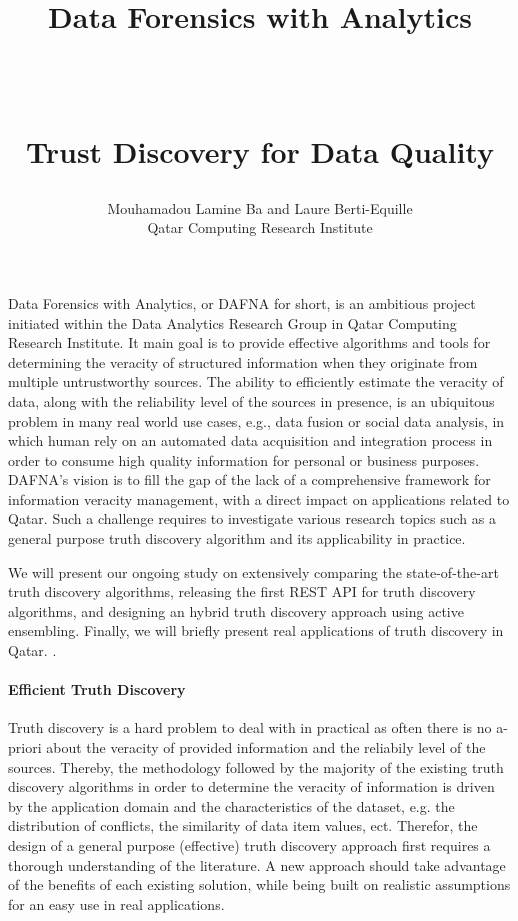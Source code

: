 \documentclass[paper=a4, fontsize=11pt]{scrartcl}	%
\title{ \vspace{-1in} 	\usefont{OT1}{bch}{b}{n}
		\huge \strut Data Forensics with Analytics\strut \\
		\Large \bfseries \strut Trust Discovery for Data Quality\strut
}
\author{ 									\usefont{OT1}{bch}{m}{n}
        Mouhamadou Lamine Ba and Laure Berti-Equille\\		\usefont{OT1}{bch}{m}{n}
        Qatar Computing Research Institute\\	\usefont{OT1}{bch}{m}{n}
}
\date{}
\numberwithin{equation}{section}															%
\numberwithin{figure}{section}																%
\numberwithin{table}{section}																%
\begin{document}
\maketitle
 
 Data Forensics with Analytics, or DAFNA for short, is an ambitious project initiated within the Data Analytics Research Group in Qatar Computing Research
 Institute. It main goal is to provide effective algorithms and tools for determining the veracity of structured information when they originate from  
 multiple untrustworthy sources. The ability to efficiently estimate the veracity of data, along with the reliability level of the sources in presence,
 is an ubiquitous problem in many real world use cases, e.g., data fusion or social data analysis, in which human rely on an automated data acquisition
 and integration process in order to consume high quality information for personal or business purposes. DAFNA's vision is to fill the gap of the  lack of 
 a comprehensive framework for information veracity management, with a direct impact on applications related to Qatar. Such a challenge requires to investigate
 various research topics such as a general purpose truth discovery algorithm and its applicability in practice.

We will present our ongoing study on extensively comparing the state-of-the-art truth discovery algorithms, releasing the first REST API for truth discovery algorithms,
and designing an hybrid truth discovery approach using active ensembling. Finally, we will briefly present real applications of truth discovery in Qatar.
.
 
 \paragraph*{Efficient Truth Discovery}Truth discovery is a hard problem to deal with in practical as often there is no a-priori
 about the veracity of provided information and the reliabily level of the sources. Thereby, the methodology followed by the majority
 of the existing truth discovery algorithms in order to determine the veracity of information is driven by the application domain
 and the characteristics of the dataset, e.g. the distribution of conflicts, the similarity of data item values, ect. Therefor,
 the design of a general purpose (effective) truth discovery approach first requires a thorough understanding of the literature. A
 new approach should take advantage of the benefits of each existing solution, while being built on realistic assumptions for an easy
 use in real applications.
 
\end{document}
